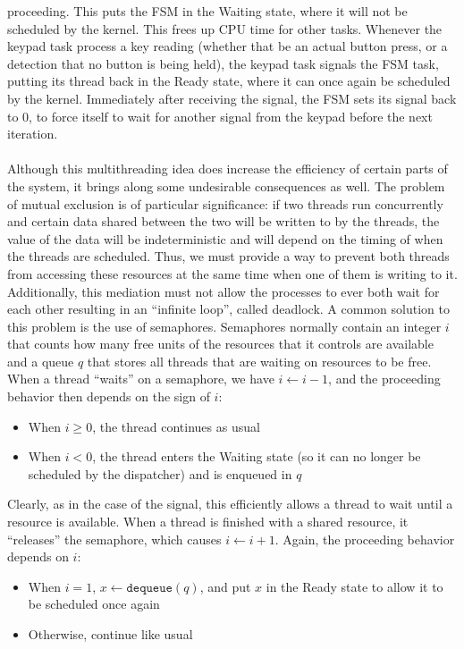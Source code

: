 \documentclass[12pt]{report}
\begin{document}
proceeding. This puts the FSM in the Waiting state, where it will not be scheduled by the kernel.
This frees up CPU time for other tasks. Whenever the keypad task process a key reading (whether that
be an actual button press, or a detection that no button is being held), the keypad task signals the
FSM task, putting its thread back in the Ready state, where it can once again be scheduled by the
kernel. Immediately after receiving the signal, the FSM sets its signal back to 0, to force itself
to wait for another signal from the keypad before the next iteration.\\\\
Although this multithreading idea does increase the efficiency of certain parts of the system, it
brings along some undesirable consequences as well. The problem of mutual exclusion is of particular
significance: if two threads run concurrently and certain data shared between the two will be
written to by the threads, the value of the data will be indeterministic and will depend on the
timing of when the threads are scheduled. Thus, we must provide a way to prevent both threads from
accessing these resources at the same time when one of them is writing to it. Additionally, this
mediation must not allow the processes to ever both wait for each other resulting in an ``infinite
loop'', called deadlock. A common solution to this problem is the use of semaphores. Semaphores
normally contain an integer $i$ that counts how many free units of the resources that it controls
are available and a queue $q$ that stores all threads that are waiting on resources to be free. When
a thread ``waits'' on a semaphore, we have $i\leftarrow i-1$, and the proceeding behavior then depends on the
sign of $i$:
\begin{itemize}
	\item When $i\geq 0$, the thread continues as usual
	\item When $i<0$, the thread enters the Waiting state (so it can no longer be scheduled by the
		dispatcher) and is enqueued in $q$
\end{itemize}
Clearly, as in the case of the signal, this efficiently allows a thread to wait until a resource is
available. When a thread is finished with a shared resource, it ``releases'' the semaphore, which
causes $i\leftarrow i+1$. Again, the proceeding behavior depends on $i$:
\begin{itemize}
	\item When $i = 1$, $x\leftarrow\texttt{dequeue}(q)$, and put $x$ in the Ready state to allow it
		to be scheduled once again
	\item Otherwise, continue like usual
\end{itemize}
\end{document}
